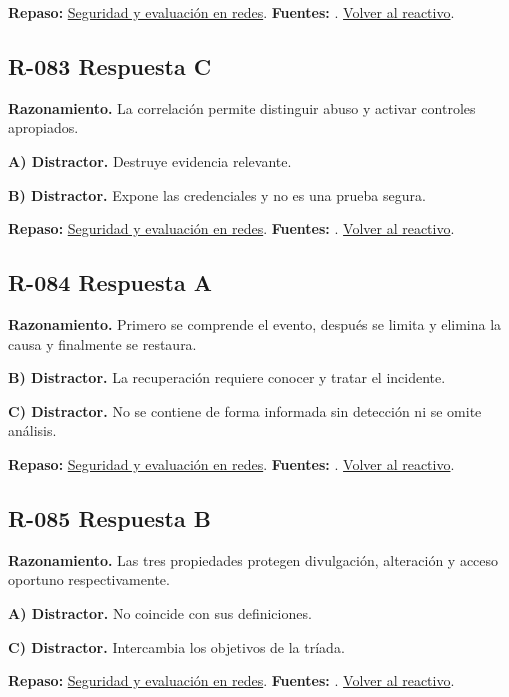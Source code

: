 \textbf{Repaso:} \hyperref[sec:r3]{Seguridad y evaluación en redes}. \textbf{Fuentes:} \cite{nistsecurity,owasp,aes,tls}. \hyperref[q:R-082]{Volver al reactivo}.\par\medskip

\subsection*{R-083 \quad Respuesta C}\label{s:R-083}
\textbf{Razonamiento.} La correlación permite distinguir abuso y activar controles apropiados.

\textbf{A) Distractor. }Destruye evidencia relevante.

\textbf{B) Distractor. }Expone las credenciales y no es una prueba segura.

\textbf{Repaso:} \hyperref[sec:r3]{Seguridad y evaluación en redes}. \textbf{Fuentes:} \cite{nistsecurity,owasp,aes,tls}. \hyperref[q:R-083]{Volver al reactivo}.\par\medskip

\subsection*{R-084 \quad Respuesta A}\label{s:R-084}
\textbf{Razonamiento.} Primero se comprende el evento, después se limita y elimina la causa y finalmente se restaura.

\textbf{B) Distractor. }La recuperación requiere conocer y tratar el incidente.

\textbf{C) Distractor. }No se contiene de forma informada sin detección ni se omite análisis.

\textbf{Repaso:} \hyperref[sec:r3]{Seguridad y evaluación en redes}. \textbf{Fuentes:} \cite{nistsecurity,owasp,aes,tls}. \hyperref[q:R-084]{Volver al reactivo}.\par\medskip

\subsection*{R-085 \quad Respuesta B}\label{s:R-085}
\textbf{Razonamiento.} Las tres propiedades protegen divulgación, alteración y acceso oportuno respectivamente.

\textbf{A) Distractor. }No coincide con sus definiciones.

\textbf{C) Distractor. }Intercambia los objetivos de la tríada.

\textbf{Repaso:} \hyperref[sec:r3]{Seguridad y evaluación en redes}. \textbf{Fuentes:} \cite{nistsecurity,owasp,aes,tls}. \hyperref[q:R-085]{Volver al reactivo}.\par\medskip

